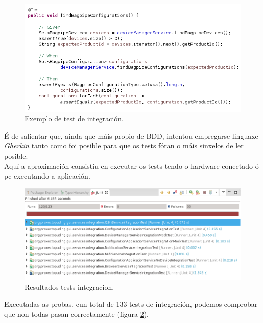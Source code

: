   \begin{figure}[htbp]
   \centering
   \includegraphics[scale=0.8,keepaspectratio=true]{./imagenes/test-integracion.png}
   \caption{Exemplo de test de integración.}
   \label{figura:TestIntegracion}
  \end{figure}
  
  É de salientar que, aínda que máis propio de BDD, intentou empregarse linguaxe
  \textit{Gherkin} \cite{Gherkin} tanto como foi posible para que os tests fóran
  o máis sinxelos de ler posible. \\
 
 Aquí a aproximación consistiu en executar os tests tendo o hardware conectado ó
 pc executando a aplicación. \\
 
 \begin{figure}[htbp]
  \centering
  \includegraphics[scale=0.6,keepaspectratio=true]{./imagenes/resultados-tests-integracion.png}
  \caption{Resultados tests integracion.}
  \label{figura:ResultadosTestIntegracion}
 \end{figure}
  
 Executadas as probas, cun total de 133 tests de integración, podemos comprobar
 que non todas pasan correctamente
 (figura \ref{figura:ResultadosTestIntegracion}). \\
 
